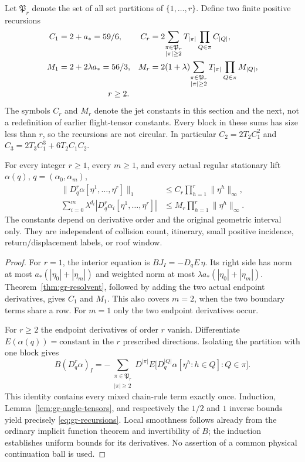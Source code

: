 Let $\mathfrak P_r$ denote the set of all set partitions of
$\{1,\ldots,r\}$. Define two finite positive recursions
\begin{align}
 C_1&=2+a_* =59/6,
 &C_r&=2\!\sum_{\substack{\pi\in\mathfrak P_r\\|\pi|\ge2}}
               T_{|\pi|}\prod_{Q\in\pi}C_{|Q|},\\
 M_1&=2+2\lambda a_* =56/3,
 &M_r&=2(1+\lambda)\!
       \sum_{\substack{\pi\in\mathfrak P_r\\|\pi|\ge2}}
               T_{|\pi|}\prod_{Q\in\pi}M_{|Q|},\\[-2pt]
 &&&\hspace{-18mm}r\ge2.\label{eq:gr-recursions}
\end{align}
The symbols $C_r$ and $M_r$ denote the jet constants in this section
and the next, not a redefinition of earlier flight-tensor constants.
Every block in these sums has size less than $r$, so the recursions
are not circular. In particular $C_2=2T_2C_1^2$ and
$C_3=2T_3C_1^3+6T_2C_1C_2$.

\begin{theorem}
\label{thm:gr-jets}
For every integer $r\ge1$, every $m\ge1$, and every actual regular
stationary lift $\alpha(q)$, $q=(\alpha_0,\alpha_m)$,
\begin{align}
 \|D_q^r\alpha[\eta^1,\ldots,\eta^r]\|_1
       &\le C_r\prod_{h=1}^r\|\eta^h\|_\infty,\\
 \sum_{i=0}^m\lambda^{d_i}
       |D_q^r\alpha_i[\eta^1,\ldots,\eta^r]|
       &\le M_r\prod_{h=1}^r\|\eta^h\|_\infty.
 \label{eq:gr-jets}
\end{align}
The constants depend on derivative order and the original geometric
interval only. They are independent of collision count, itinerary,
small positive incidence, return/displacement labels, or roof window.
\end{theorem}
\begin{proof}
For $r=1$, the interior equation is
$BJ_I=-D_{q}E\,\eta$. Its right side has norm at most
$a_*(|\eta_0|+|\eta_m|)$ and weighted norm at most
$\lambda a_*(|\eta_0|+|\eta_m|)$.
Theorem~\ref{thm:gr-resolvent}, followed by adding the two actual
endpoint derivatives, gives $C_1$ and $M_1$. This also covers $m=2$,
when the two boundary terms share a row. For $m=1$ only the two
endpoint derivatives occur.

For $r\ge2$ the endpoint derivatives of order $r$ vanish. Differentiate
$E(\alpha(q))=\mathrm{constant}$ in the $r$ prescribed directions.
Isolating the partition with one block gives
\[
 B(D_q^r\alpha)_I
 =-\!\sum_{\substack{\pi\in\mathfrak P_r\\|\pi|\ge2}}
 D^{|\pi|}E\bigl[D_q^{|Q|}\alpha[\eta^h:h\in Q]:Q\in\pi\bigr].
\]
This identity contains every mixed chain-rule term exactly once.
Induction, Lemma~\ref{lem:gr-angle-tensors}, and respectively the
$1/2$ and $1$ inverse bounds yield precisely
\eqref{eq:gr-recursions}. Local smoothness follows already from the
ordinary implicit function theorem and invertibility of $B$; the
induction establishes uniform bounds for its derivatives. No assertion
of a common physical continuation ball is used.
\end{proof}


